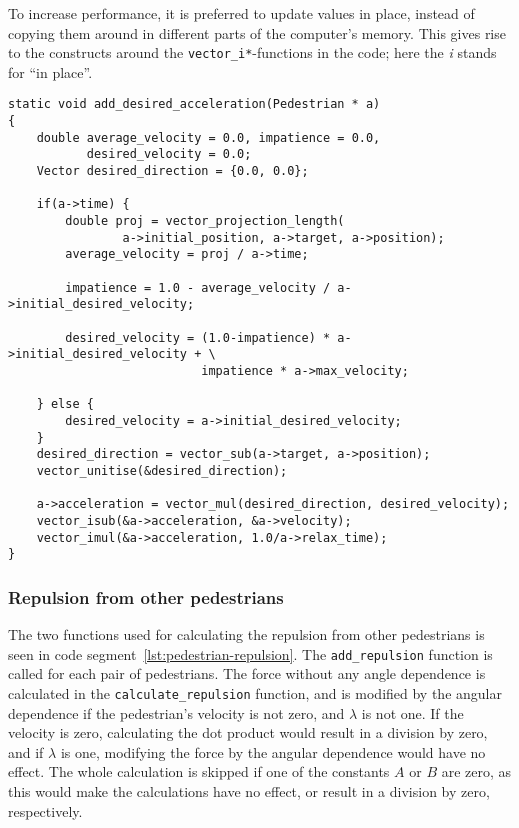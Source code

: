 To increase performance, it is preferred to update values in place, instead of 
copying them around in different parts of the computer's memory. This gives 
rise to the constructs around the \texttt{vector\_i*}-functions in the code; 
here the \emph{i} stands for ``in place''.

\begin{lstlisting}[caption={Calculating the desired 
    force.},label=lst:desired-force]
static void add_desired_acceleration(Pedestrian * a)
{
    double average_velocity = 0.0, impatience = 0.0, 
           desired_velocity = 0.0;
    Vector desired_direction = {0.0, 0.0};

    if(a->time) {
        double proj = vector_projection_length(
                a->initial_position, a->target, a->position);
        average_velocity = proj / a->time;

        impatience = 1.0 - average_velocity / a->initial_desired_velocity;

        desired_velocity = (1.0-impatience) * a->initial_desired_velocity + \
                           impatience * a->max_velocity;

    } else {
        desired_velocity = a->initial_desired_velocity;
    }
    desired_direction = vector_sub(a->target, a->position);
    vector_unitise(&desired_direction);

    a->acceleration = vector_mul(desired_direction, desired_velocity);
    vector_isub(&a->acceleration, &a->velocity);
    vector_imul(&a->acceleration, 1.0/a->relax_time);
}
\end{lstlisting}

\subsubsection{Repulsion from other pedestrians}
The two functions used for calculating the repulsion from other pedestrians is seen 
in code segment~\ref{lst:pedestrian-repulsion}. The \texttt{add\_repulsion} function 
is called for each pair of pedestrians. The force without any angle dependence is 
calculated in the \texttt{calculate\_repulsion} function, and is modified by 
the angular dependence if the pedestrian's velocity is not zero, and $\lambda$ is 
not one. If the velocity is zero, calculating the dot product would result in 
a division by zero, and if $\lambda$ is one, modifying the force by the 
angular dependence would have no effect. The whole calculation is skipped if 
one of the constants $A$ or $B$ are zero, as this would make the calculations 
have no effect, or result in a division by zero, respectively.

